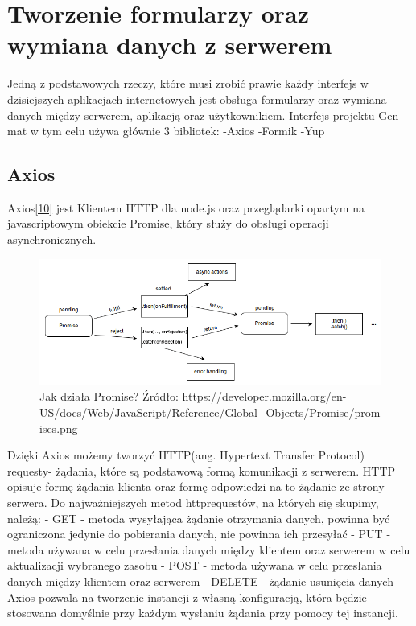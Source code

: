 \documentclass[oneside,polski,logo,indent]{amuthesis}
\begin{document}
\begin{enumerate}
\begin{enumerate}
\begin{figure}[H]
\end{figure}	



\section{Tworzenie formularzy oraz wymiana danych z serwerem}
\bigbreak
Jedną z podstawowych rzeczy, które musi zrobić prawie każdy interfejs w dzisiejszych aplikacjach internetowych jest obsługa formularzy oraz wymiana danych między serwerem, aplikacją oraz użytkownikiem. Interfejs projektu Gen-mat w tym celu używa głównie 3 bibliotek:
\newline
-Axios
\newline
-Formik
\newline
-Yup

\subsection{Axios}
Axios\hyperlink{[10]}{[10]} jest Klientem HTTP dla node.js oraz przeglądarki opartym na javascriptowym obiekcie Promise, który służy do obsługi operacji asynchronicznych.

\begin{figure}[H]
\centering
\includegraphics[width=13cm]{promises.png}
\caption{Jak działa Promise?
\newline
Źródło: \url{https://developer.mozilla.org/en-US/docs/Web/JavaScript/Reference/Global_Objects/Promise/promises.png}
}
\label{react dev example.jpg}
\end{figure}

Dzięki Axios możemy tworzyć HTTP(ang. Hypertext Transfer Protocol) requesty- żądania, które są podstawową formą komunikacji z serwerem. HTTP opisuje formę żądania klienta oraz formę odpowiedzi na to żądanie ze strony serwera. Do najważniejszych metod httprequestów, na których się skupimy, należą:
\newline
- GET - metoda wysyłająca żądanie otrzymania danych, powinna być ograniczona jedynie do pobierania danych, nie powinna ich przesyłać
\newline
- PUT - metoda używana w celu przesłania danych między klientem oraz serwerem w celu aktualizacji wybranego zasobu
\newline
- POST - metoda używana w celu przesłania danych między klientem oraz serwerem
\newline
- DELETE - żądanie usunięcia danych
\newline
Axios pozwala na tworzenie instancji z własną konfiguracją, która będzie stosowana domyślnie przy każdym wysłaniu żądania przy pomocy
tej instancji.



\end{enumerate}
\end{enumerate}
\end{document}
